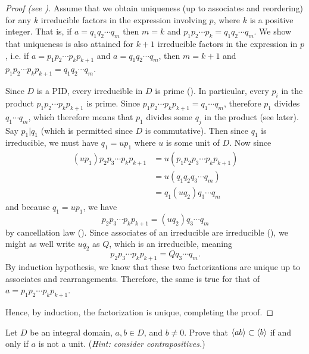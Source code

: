 \begin{proof}[Proof (see {\cite[pp.~313-314]{gallian_2016}})]
    Assume that we obtain uniqueness (up to associates and reordering) for any $k$ irreducible factors in the expression involving $p$, where $k$ is a positive integer. That is, if $a = q_1q_2 \cdots q_m$ then $m = k$ and $p_1p_2\cdots p_k = q_1q_2 \cdots q_m$. We show that uniqueness is also attained for $k + 1$ irreducible factors in the expression in $p$, i.e. if $a = p_1p_2\cdots p_kp_{k+1}$ and $a = q_1q_2 \cdots q_m$, then $m = k+1$ and $p_1p_2\cdots p_kp_{k+1} = q_1q_2 \cdots q_m$.

    Since $D$ is a PID, every irreducible in $D$ is prime (). In particular, every $p_i$ in the product $p_1p_2\cdots p_kp_{k+1}$ is prime. Since $p_1p_2\cdots p_kp_{k+1} = q_1\cdots q_m$, therefore $p_1$ divides $q_1\cdots q_m$, which therefore means that $p_1$ divides some $q_j$ in the product (see  later). Say $p_1 \vert q_1$ (which is permitted since $D$ is commutative). Then since $q_1$ is irreducible, we must have $q_1 = up_1$ where $u$ is some unit of $D$. Now since
    \begin{align*}
        (up_1)p_2p_3\cdots p_kp_{k+1} &= u\left(p_1p_2p_3\cdots p_kp_{k+1}\right)\\
        &= u\left(q_1q_2q_3\cdots q_m\right)\\
        &= q_1(uq_2)q_3\cdots q_m
    \end{align*}
    and because $q_1 = up_1$, we have
    \[
        p_2p_3\cdots p_kp_{k+1} = (uq_2)q_3\cdots q_m
    \]
    by cancellation law (). Since associates of an irreducible are irreducible (), we might as well write $uq_2$ as $Q$, which is an irreducible, meaning
    \[
        p_2p_3\cdots p_kp_{k+1} = Qq_3\cdots q_m.
    \]
    By induction hypothesis, we know that these two factorizations are unique up to associates and rearrangements. Therefore, the same is true for that of $a = p_1p_2\cdots p_kp_{k+1}$.

    Hence, by induction, the factorization is unique, completing the proof.
\end{proof}

\begin{exercise}\label{exercise-princ-ab-subset-of-b-iff-a-not-unit}
    Let $D$ be an integral domain, $a,b\in D$, and $b \neq 0$. Prove that $\left\langle ab\right\rangle \subset \left\langle b\right\rangle$ if and only if $a$ is not a unit.\newline
    (\textit{Hint: consider contrapositives.})
\end{exercise}

